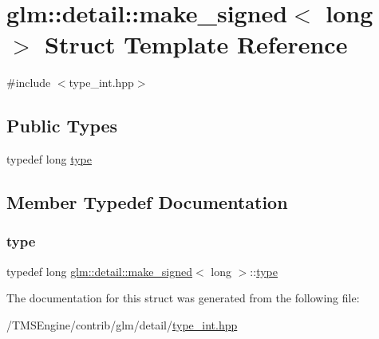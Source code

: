 \hypertarget{structglm_1_1detail_1_1make__signed_3_01long_01_4}{}\section{glm\+:\+:detail\+:\+:make\+\_\+signed$<$ long $>$ Struct Template Reference}
\label{structglm_1_1detail_1_1make__signed_3_01long_01_4}


{\ttfamily \#include $<$type\+\_\+int.\+hpp$>$}

\subsection*{Public Types}
\begin{DoxyCompactItemize}
\item 
typedef long \hyperlink{structglm_1_1detail_1_1make__signed_3_01long_01_4_ab9807f0a681192166dd820195c967222}{type}
\end{DoxyCompactItemize}


\subsection{Member Typedef Documentation}
\mbox{\label{structglm_1_1detail_1_1make__signed_3_01long_01_4_ab9807f0a681192166dd820195c967222}} 
\subsubsection{\texorpdfstring{type}{type}}
{\footnotesize\ttfamily typedef long \hyperlink{structglm_1_1detail_1_1make__signed}{glm\+::detail\+::make\+\_\+signed}$<$ long $>$\+::\hyperlink{structglm_1_1detail_1_1make__signed_3_01long_01_4_ab9807f0a681192166dd820195c967222}{type}}



The documentation for this struct was generated from the following file\+:\begin{DoxyCompactItemize}
\item 
/\+T\+M\+S\+Engine/contrib/glm/detail/\hyperlink{type__int_8hpp}{type\+\_\+int.\+hpp}\end{DoxyCompactItemize}
